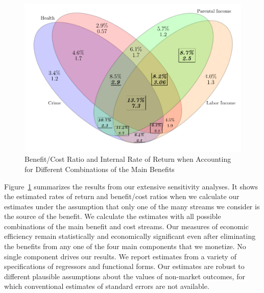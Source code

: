 \begin{figure}[!htbp]
\caption{Benefit/Cost Ratio and Internal Rate of Return when Accounting for Different Combinations of the Main Benefits}\label{figure:vennpooled}
\centering
\includegraphics[width=.7\columnwidth]{output/venn_pooled.pdf}
\end{figure}

Figure~\ref{figure:vennpooled} summarizes the results from our extensive sensitivity analyses. It shows the estimated rates of return and benefit/cost ratios when we calculate our estimates under the assumption that only one of the many streams we consider is the source of the benefit. We calculate the estimates with all possible combinations of the main benefit and cost streams. Our measures of economic efficiency remain statistically and economically significant even after eliminating the benefits from any one of the four main components that we monetize. No single component drives our results. We report estimates from a variety of specifications of regressors and functional forms. Our estimates are robust to different plausible assumptions about the values of non-market outcomes, for which conventional estimates of standard errors are not available.

